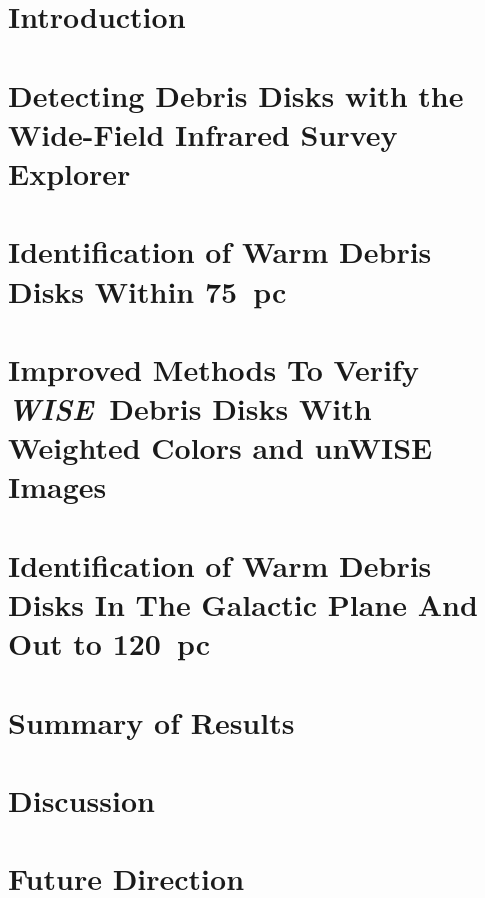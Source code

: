 \documentclass[phd,bottom,nosig]{usbthesis}
\newcommand{\WS}{\textit{WISE}}
\begin{document}
\tableofcontents %
\listoffigures %
\listoftables %

\begin{acknowledgements}

\end{acknowledgements}

\pagestyle{thesis}



\newpage
{}

\chapter{Introduction} \label{chap:intro}


\chapter{Detecting Debris Disks with the Wide-Field Infrared Survey Explorer}\label{chap:wise_method}


\chapter{Identification of Warm Debris Disks Within 75~pc} \label{chap:iddisks}

\clearpage
%


\chapter{Improved Methods To Verify \WS\ Debris Disks With Weighted Colors and unWISE Images}\label{chap:confirm}


\chapter{Identification of Warm Debris Disks In The Galactic Plane And Out to 120~pc}\label{chap:120pc}


\chapter{Summary of Results}\label{chap:summary}



\chapter{Discussion}\label{chap:discussion}



\chapter{Future Direction}\label{chap:future}




\appendix


%
%

\end{document}
